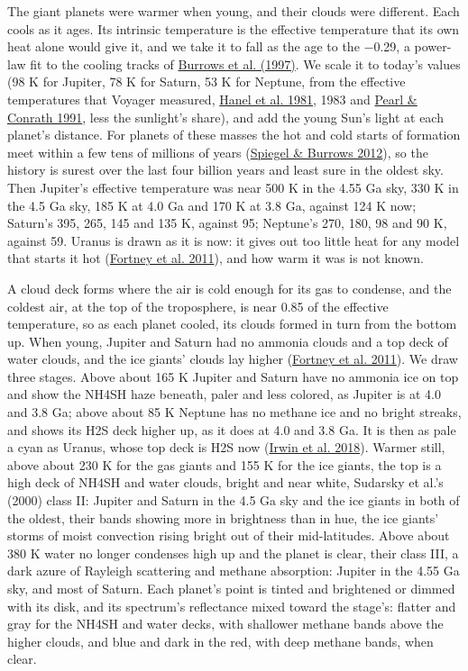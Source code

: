 \documentclass[9pt,twocolumn]{extarticle}
\begin{document}
The giant planets were warmer when young, and their clouds were different. Each cools as it ages. Its intrinsic temperature is the effective temperature that its own heat alone would give it, and we take it to fall as the age to the $-$0.29, a power-law fit to the cooling tracks of \protect\hyperlink{cite.burrows1997}{Burrows et al. (1997)}. We scale it to today's values (98 K for Jupiter, 78 K for Saturn, 53 K for Neptune, from the effective temperatures that Voyager measured, \protect\hyperlink{cite.hanel1981}{Hanel et al. 1981}, 1983 and \protect\hyperlink{cite.pearl1991}{Pearl \& Conrath 1991}, less the sunlight's share), and add the young Sun's light at each planet's distance. For planets of these masses the hot and cold starts of formation meet within a few tens of millions of years (\protect\hyperlink{cite.spiegel2012}{Spiegel \& Burrows 2012}), so the history is surest over the last four billion years and least sure in the oldest sky. Then Jupiter's effective temperature was near 500 K in the 4.55 Ga sky, 330 K in the 4.5 Ga sky, 185 K at 4.0 Ga and 170 K at 3.8 Ga, against 124 K now; Saturn's 395, 265, 145 and 135 K, against 95; Neptune's 270, 180, 98 and 90 K, against 59. Uranus is drawn as it is now: it gives out too little heat for any model that starts it hot (\protect\hyperlink{cite.fortney2011}{Fortney et al. 2011}), and how warm it was is not known.

A cloud deck forms where the air is cold enough for its gas to condense, and the coldest air, at the top of the troposphere, is near 0.85 of the effective temperature, so as each planet cooled, its clouds formed in turn from the bottom up. When young, Jupiter and Saturn had no ammonia clouds and a top deck of water clouds, and the ice giants' clouds lay higher (\protect\hyperlink{cite.fortney2011}{Fortney et al. 2011}). We draw three stages. Above about 165 K Jupiter and Saturn have no ammonia ice on top and show the NH4SH haze beneath, paler and less colored, as Jupiter is at 4.0 and 3.8 Ga; above about 85 K Neptune has no methane ice and no bright streaks, and shows its H2S deck higher up, as it does at 4.0 and 3.8 Ga. It is then as pale a cyan as Uranus, whose top deck is H2S now (\protect\hyperlink{cite.irwin2018}{Irwin et al. 2018}). Warmer still, above about 230 K for the gas giants and 155 K for the ice giants, the top is a high deck of NH4SH and water clouds, bright and near white, Sudarsky et al.'s (2000) class II: Jupiter and Saturn in the 4.5 Ga sky and the ice giants in both of the oldest, their bands showing more in brightness than in hue, the ice giants' storms of moist convection rising bright out of their mid-latitudes. Above about 380 K water no longer condenses high up and the planet is clear, their class III, a dark azure of Rayleigh scattering and methane absorption: Jupiter in the 4.55 Ga sky, and most of Saturn. Each planet's point is tinted and brightened or dimmed with its disk, and its spectrum's reflectance mixed toward the stage's: flatter and gray for the NH4SH and water decks, with shallower methane bands above the higher clouds, and blue and dark in the red, with deep methane bands, when clear.
\end{document}
